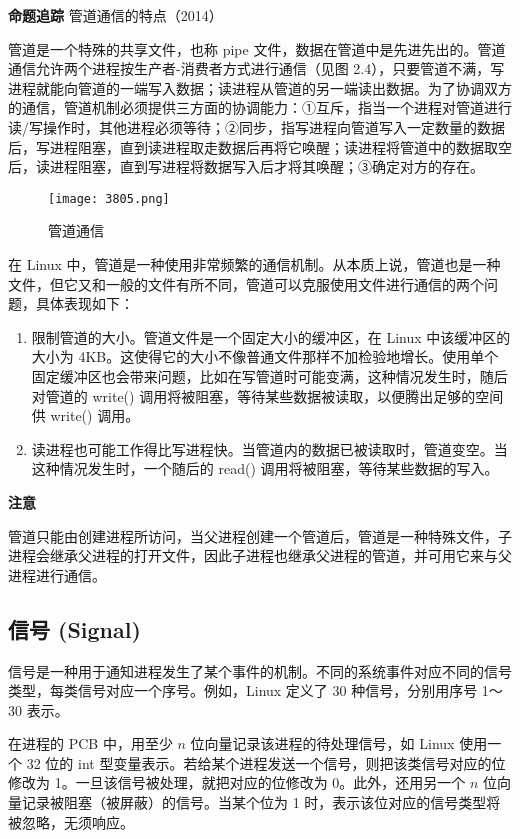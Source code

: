 \documentclass{ctexbook}
\begin{document}
	\textbf{命题追踪} 管道通信的特点（2014）
	
	管道是一个特殊的共享文件，也称 pipe 文件，数据在管道中是先进先出的。管道通信允许两个进程按生产者-消费者方式进行通信（见图 2.4），只要管道不满，写进程就能向管道的一端写入数据；读进程从管道的另一端读出数据。为了协调双方的通信，管道机制必须提供三方面的协调能力：①互斥，指当一个进程对管道进行读/写操作时，其他进程必须等待；②同步，指写进程向管道写入一定数量的数据后，写进程阻塞，直到读进程取走数据后再将它唤醒；读进程将管道中的数据取空后，读进程阻塞，直到写进程将数据写入后才将其唤醒；③确定对方的存在。
	
	\begin{figure}[h]
		\centering
		\texttt{[image: 3805.png]}
		\caption{管道通信}
		\label{fig:pipe_communication}
	\end{figure}
	
	在 Linux 中，管道是一种使用非常频繁的通信机制。从本质上说，管道也是一种文件，但它又和一般的文件有所不同，管道可以克服使用文件进行通信的两个问题，具体表现如下：
	\begin{enumerate}
		\item 限制管道的大小。管道文件是一个固定大小的缓冲区，在 Linux 中该缓冲区的大小为 4KB。这使得它的大小不像普通文件那样不加检验地增长。使用单个固定缓冲区也会带来问题，比如在写管道时可能变满，这种情况发生时，随后对管道的 write() 调用将被阻塞，等待某些数据被读取，以便腾出足够的空间供 write() 调用。
		\item 读进程也可能工作得比写进程快。当管道内的数据已被读取时，管道变空。当这种情况发生时，一个随后的 read() 调用将被阻塞，等待某些数据的写入。
	\end{enumerate}
	
	\textbf{注意}
	
	管道只能由创建进程所访问，当父进程创建一个管道后，管道是一种特殊文件，子进程会继承父进程的打开文件，因此子进程也继承父进程的管道，并可用它来与父进程进行通信。
	
	\subsection{信号 (Signal)}
	
	信号是一种用于通知进程发生了某个事件的机制。不同的系统事件对应不同的信号类型，每类信号对应一个序号。例如，Linux 定义了 30 种信号，分别用序号 1～30 表示。
	
	在进程的 PCB 中，用至少 $n$ 位向量记录该进程的待处理信号，如 Linux 使用一个 32 位的 int 型变量表示。若给某个进程发送一个信号，则把该类信号对应的位修改为 1。一旦该信号被处理，就把对应的位修改为 0。此外，还用另一个 $n$ 位向量记录被阻塞（被屏蔽）的信号。当某个位为 1 时，表示该位对应的信号类型将被忽略，无须响应。
	
\end{document}
